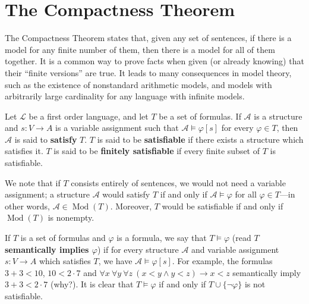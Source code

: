 \documentclass{article}
\def\A{\mathcal A}
\def\Lang{\mathcal L}
\def\Mod{\operatorname{Mod}}
\begin{document}
\section*{The Compactness Theorem}

The Compactness Theorem states that, given any set of sentences, if there is a model for any finite number of them, then there is a model for all of them together.  It is a common way to prove facts when given (or already knowing) that their ``finite versions'' are true.  It leads to many consequences in model theory, such as the existence of nonstandard arithmetic models, and models with arbitrarily large cardinality for any language with infinite models.

Let $\Lang$ be a first order language, and let $T$ be a set of formulas.  If $\A$ is a structure and $s:V\to A$ is a variable assignment such that $\A\models\varphi[s]$ for every $\varphi\in T$, then $\A$ is said to \textbf{satisfy} $T$.  $T$ is said to be \textbf{satisfiable} if there exists a structure which satisfies it.  $T$ is said to be \textbf{finitely satisfiable} if every finite subset of $T$ is satisfiable.

We note that if $T$ consists entirely of sentences, we would not need a variable assignment; a structure $\A$ would satisfy $T$ if and only if $\A\models\varphi$ for all $\varphi\in T$\----in other words, $\A\in\Mod(T)$.  Moreover, $T$ would be satisfiable if and only if $\Mod(T)$ is nonempty.

If $T$ is a set of formulas and $\varphi$ is a formula, we say that $T\models\varphi$ (read \textbf{$T$ semantically implies $\varphi$}) if for every structure $\A$ and variable assignment $s:V\to A$ which satisfies $T$, we have $\A\models\varphi[s]$.  For example, the formulas $3+3<10$, $10<2\cdot 7$ and $\forall x~\forall y~\forall z~(x<y\wedge y<z)\to x<z$ semantically imply $3+3<2\cdot 7$ (why?).  It is clear that $T\models\varphi$ if and only if $T\cup\{\neg\varphi\}$ is not satisfiable.
\end{document}
